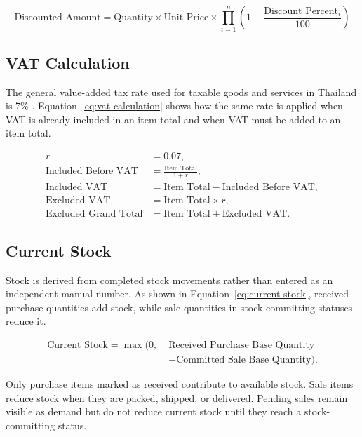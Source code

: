 \begin{equation}
\label{eq:discounted-amount}
\text{Discounted Amount} =
\text{Quantity} \times \text{Unit Price} \times
\prod_{i=1}^{n}\left(1 - \frac{\text{Discount Percent}_i}{100}\right)
\end{equation}

\subsection{VAT Calculation}
The general value-added tax rate used for taxable goods and services in Thailand is 7\% \cite{thailand_revenue_vat}. Equation~\ref{eq:vat-calculation} shows how the same rate is applied when VAT is already included in an item total and when VAT must be added to an item total.

\begin{equation}
\label{eq:vat-calculation}
\begin{aligned}
r &= 0.07,\\
\text{Included Before VAT} &= \frac{\text{Item Total}}{1+r},\\
\text{Included VAT} &= \text{Item Total}-\text{Included Before VAT},\\
\text{Excluded VAT} &= \text{Item Total}\times r,\\
\text{Excluded Grand Total} &= \text{Item Total}+\text{Excluded VAT}.
\end{aligned}
\end{equation}

\subsection{Current Stock}
Stock is derived from completed stock movements rather than entered as an independent manual number. As shown in Equation~\ref{eq:current-stock}, received purchase quantities add stock, while sale quantities in stock-committing statuses reduce it.

\begin{equation}
\label{eq:current-stock}
\begin{aligned}
\text{Current Stock} = \max(0,\;&\text{Received Purchase Base Quantity}\\
&-\text{Committed Sale Base Quantity}).
\end{aligned}
\end{equation}

Only purchase items marked as received contribute to available stock. Sale items reduce stock when they are packed, shipped, or delivered. Pending sales remain visible as demand but do not reduce current stock until they reach a stock-committing status.

